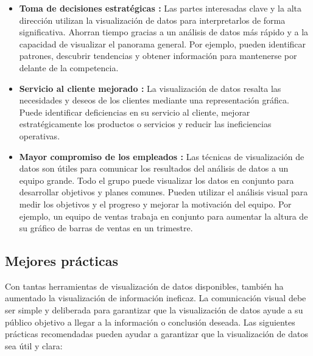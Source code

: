 \begin{itemize}
  \item {\textbf{Toma de decisiones estratégicas :}} Las partes interesadas
  clave y la alta dirección utilizan la visualización de datos para interpretarlos
  de forma significativa. Ahorran tiempo gracias a un análisis de datos más
  rápido y a la capacidad de visualizar el panorama general. Por ejemplo,
  pueden identificar patrones, descubrir tendencias y obtener información
  para mantenerse por delante de la competencia.
  \item {\textbf{Servicio al cliente mejorado :}} La visualización de datos
  resalta las necesidades y deseos de los clientes mediante una representación
  gráfica. Puede identificar deficiencias en su servicio al cliente, mejorar
  estratégicamente los productos o servicios y reducir las ineficiencias operativas.
  \item {\textbf{Mayor compromiso de los empleados :}} Las técnicas de visualización
  de datos son útiles para comunicar los resultados del análisis de datos a un
  equipo grande. Todo el grupo puede visualizar los datos en conjunto para
  desarrollar objetivos y planes comunes. Pueden utilizar el análisis visual para medir
  los objetivos y el progreso y mejorar la motivación del equipo. Por ejemplo, un
  equipo de ventas trabaja en conjunto para aumentar la altura de su gráfico de barras
  de ventas en un trimestre.
\end{itemize}

\subsection{Mejores prácticas}
Con tantas herramientas de visualización de datos disponibles, también ha aumentado
la visualización de información ineficaz. La comunicación visual debe ser simple
y deliberada para garantizar que la visualización de datos ayude a su público
objetivo a llegar a la información o conclusión deseada. Las siguientes prácticas
recomendadas pueden ayudar a garantizar que la visualización de datos sea útil
y clara:

